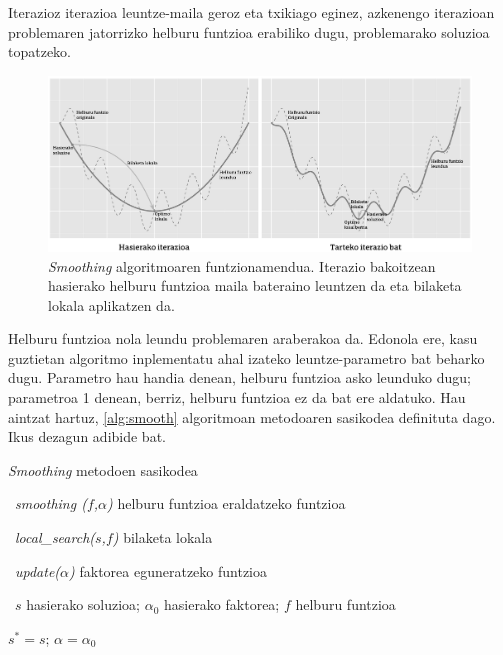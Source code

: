 \documentclass[eu]{ifirak}\usepackage[]{graphicx}\usepackage[]{color}
\begin{document}
Iterazioz iterazioa leuntze-maila geroz eta txikiago eginez, azkenengo iterazioan problemaren jatorrizko helburu funtzioa erabiliko dugu, problemarako soluzioa topatzeko. 


\begin{figure}[t]
\centering
\includegraphics[width=0.75\linewidth]{./Irudiak/smoothing}
\caption{\textit{Smoothing} algoritmoaren funtzionamendua. Iterazio bakoitzean hasierako helburu funtzioa maila bateraino leuntzen da eta bilaketa lokala aplikatzen da.}
\label{fig:smoothing}
\end{figure}

Helburu funtzioa nola leundu problemaren araberakoa da. Edonola ere, kasu guztietan algoritmo inplementatu ahal izateko leuntze-parametro bat beharko dugu. Parametro hau handia denean, helburu funtzioa asko leunduko dugu; parametroa 1 denean, berriz, helburu funtzioa ez da bat ere aldatuko. Hau aintzat hartuz, \ref{alg:smooth} algoritmoan metodoaren sasikodea definituta dago. Ikus dezagun adibide bat.

\begin{ifalgorithm}[t]
\begin{ifpseudo}{\textit{Smoothing} metodoen sasikodea}
\item \In\ \textit{smoothing ($f$,$\alpha$)} helburu funtzioa eraldatzeko funtzioa
\item \In\ \textit{local\_search($s$,$f$)} bilaketa lokala
\item \In\ \textit{update($\alpha$)} faktorea eguneratzeko funtzioa
\item \In\ $s$ hasierako soluzioa; $\alpha_0$ hasierako faktorea; $f$ helburu funtzioa
\item  $s^* = s$; $\alpha=\alpha_0$
\item {} \Do
\item {}
\item {}
\item {}
\item \Done
\end{ifpseudo}
\caption{\textit{Smoothing} algoritmoaren sasikodea}\label{alg:smooth}
\end{ifalgorithm}
\end{document}
